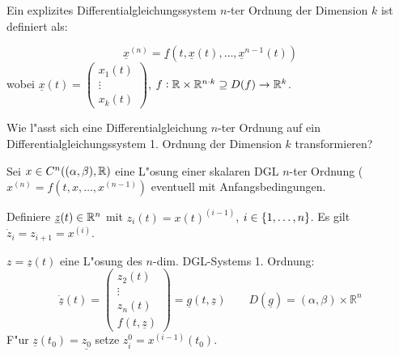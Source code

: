 \documentclass[9pt]{article}
\newcommand{\Rn}{\mathbb{R}^n}
\newcommand{\R}[1]{%
	\ifthenelse{\equal{#1}{}}
		{\mathbb{R}}
		{\mathbb{R}^{#1}}}%
\renewcommand{\vec}[1]{\underline{#1}}
\newenvironment{field}{}{\newpage}
\newif\ifnote
\newenvironment{note}{\notetrue}{\notefalse}
\newcommand{\localtag}{}
\newcommand{\globaltag}{}
\newcommand{\uuid}{}
\newcommand{\tags}[1]{
    \ifnote 
        \renewcommand{\localtag}{#1}
    \else
        \renewcommand{\globaltag}{#1}
    \fi 
    }
\newcommand{\xplain}[1]{\renewcommand{\uuid}{#1}}
\begin{document}
\begin{note}
	\xplain{UUID}
	\tags{definition, satz, DGL-System}
	
	\begin{field}  %
		Ein explizites Differentialgleichungssystem $n$-ter Ordnung der Dimension $k$ ist definiert als: 
	\end{field}
	
	\begin{field}  %
		\begin{equation*}
			\vec{x}^{(n)} = \vec{f}(t, \vec{x}(t), \dots, \vec{x}^{n-1}(t))
		\end{equation*}
		wobei $\vec{x}(t) = \begin{pmatrix} x_1(t)\\ \vdots\\ x_k(t)  \end{pmatrix}$,
		$f: \R{} \times \R{}^{n\cdot k} \supseteq D(f) \rightarrow \R{k}$. 
	\end{field}
		
	\begin{field}  %
		Wie l"asst sich eine Differentialgleichung $n$-ter Ordnung auf ein Differentialgleichungssystem 1. Ordnung der Dimension $k$ transformieren?
	\end{field}
	
	\begin{field}  %
		Sei $x  \in C^n((\alpha, \beta), \R{})$ eine L"osung einer skalaren DGL $n$-ter Ordnung
		($x^{(n)} = f(t,x, \dots, x^{(n-1)})$ eventuell mit Anfangsbedingungen. 
		 
		Definiere $\vec{z}(t) \in \R{n}$ mit $ z_i(t) = x(t)^{(i-1)}$,
		  $i\in \qty{1,\dots,n}$. Es gilt $\dot{z}_i = z_{i+1} = x^{(i)}$.
		
		$z = \vec{z}(t)$ eine L"osung des $n$-dim. DGL-Systems 1. Ordnung:
		\footnotesize
		\begin{equation*}
			\vec{\dot{z}}(t) = \begin{pmatrix}z_2(t) \\ \vdots \\ z_n(t) \\ f(t, \vec{z})  \end{pmatrix} = \vec{g}(t,\vec{z}) \qquad D(\vec{g}) = (\alpha,\beta) \times \Rn
		\end{equation*} 
		\normalsize
		F"ur $\vec{z}(t_0) = \vec{z_0}$  setze  $z^0_i = x^{(i-1)}(t_0)$. 
	\end{field}
\end{note}
\end{document}
